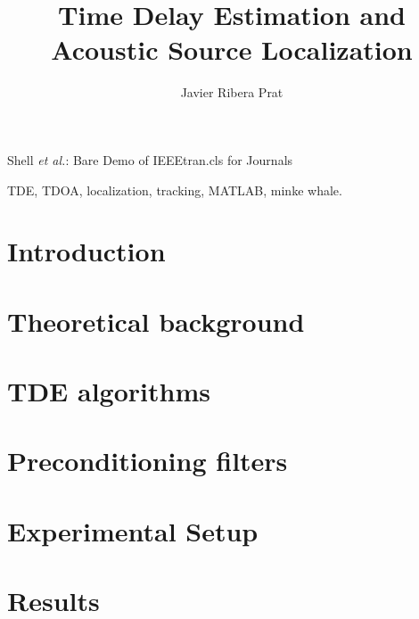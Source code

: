 \documentclass[journal]{IEEEtran}
\begin{document}
\title{Time Delay Estimation and \\Acoustic Source Localization}

\author{ Javier Ribera Prat }

{Shell \MakeLowercase{\textit{et al.}}: Bare Demo of IEEEtran.cls for Journals}

\maketitle


\begin{abstract}
  
\end{abstract}

\begin{IEEEkeywords} %
  TDE, TDOA, localization, tracking, MATLAB, minke whale.
\end{IEEEkeywords}



\section{Introduction}
  
  
\section{Theoretical background}
  

\section{TDE algorithms}
  
  
\section{Preconditioning filters}
  

\section{Experimental Setup}
  
  
\section{Results}
  
  
\end{document}
